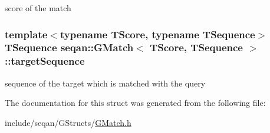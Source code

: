 score of the match \hypertarget{structseqan_1_1_g_match_a13f2c3906e402472217935df02c0c134}{
\subsubsection[{target\-Sequence}]{\setlength{\rightskip}{0pt plus 5cm}template$<$typename T\-Score, typename T\-Sequence$>$ T\-Sequence {\bf seqan\-::\-G\-Match}$<$ T\-Score, T\-Sequence $>$\-::target\-Sequence}}\label{structseqan_1_1_g_match_a13f2c3906e402472217935df02c0c134}
sequence of the target which is matched with the query 

The documentation for this struct was generated from the following file\-:\begin{DoxyCompactItemize}
\item 
include/seqan/\-G\-Structs/\hyperlink{_g_match_8h}{G\-Match.\-h}\end{DoxyCompactItemize}
